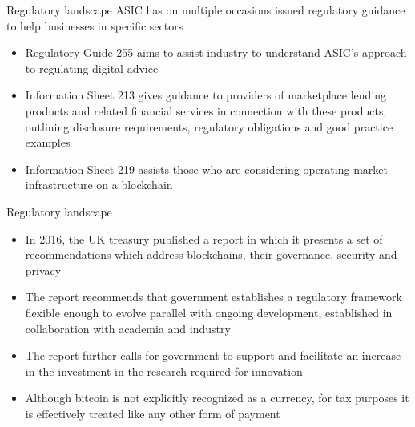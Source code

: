 \documentclass[9pt]{beamer}
\begin{document}

\begin{frame}{Regulatory landscape}
	ASIC has on multiple occasions issued regulatory guidance to help businesses in specific sectors
	\begin{itemize}
		\item Regulatory Guide 255 aims to assist industry to understand ASIC's approach to regulating digital advice
		\item Information Sheet 213 gives guidance to providers of marketplace lending products
		and related financial services in connection with these products, outlining disclosure requirements, regulatory obligations and good practice examples
		\item Information Sheet 219 assists those who are considering operating market infrastructure on a blockchain
	\end{itemize}
\end{frame}


\begin{frame}{Regulatory landscape}
	\begin{itemize}
		\item In 2016, the UK treasury published a report in which it presents a set of recommendations which address blockchains, their governance, security and privacy
		\item The report recommends that government establishes a regulatory framework flexible enough to evolve parallel with ongoing development, established in collaboration with academia and industry
		\item The report further calls for government to support and facilitate an increase in the investment in the research required for innovation
		\item Although bitcoin is not explicitly recognized as a currency, for tax purposes it is effectively treated like any other form of payment
	\end{itemize}
\end{frame}


\end{document}
